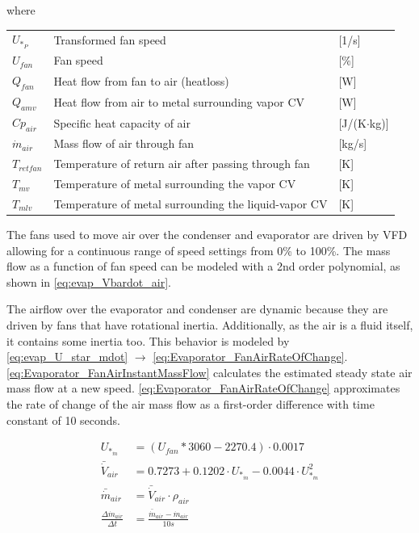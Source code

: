 where

\begin{center}
	\begin{tabular}{l p{10cm} l}
		$U_{*_P}$       & Transformed fan speed                                & [1/\si{s}]                        \\
		$U_{fan}$       & Fan speed                                            & [$\%$]                        \\
		$Q_{fan}$       & Heat flow from fan to air (heatloss)                 & [\si{W}]                          \\
		$Q_{amv}$       & Heat flow from air to metal surrounding vapor CV     & [\si{W}]                          \\
		$Cp_{air}$      & Specific heat capacity of air                        & [\si{J}/(\si{K}$ \cdot $\si{kg})] \\
		$\dot{m}_{air}$ & Mass flow of air through fan                         & [\si{kg}/\si{s}]                  \\
		$T_{retfan}$    & Temperature of return air after passing through fan  & [\si{K}]                          \\
		$T_{mv}$        & Temperature of metal surrounding the vapor CV        & [\si{K}]                          \\
		$T_{mlv}$       & Temperature of metal surrounding the liquid-vapor CV & [\si{K}]
	\end{tabular}
\end{center}

The fans used to move air over the condenser and evaporator are driven by VFD allowing for a continuous range of speed settings from 0\% to 100\%. The mass flow as a function of fan speed can be modeled with a 2nd order polynomial, as shown in \cref{eq:evap_Vbardot_air}.

The airflow over the evaporator and condenser are dynamic because they are driven by fans that have rotational inertia. Additionally, as the air is a fluid itself, it contains some inertia too. This behavior is modeled by \cref{eq:evap_U_star_mdot} $\rightarrow$ \cref{eq:Evaporator_FanAirRateOfChange}. \cref{eq:Evaporator_FanAirInstantMassFlow} calculates the estimated steady state air mass flow at a new speed. \cref{eq:Evaporator_FanAirRateOfChange} approximates the rate of change of the air mass flow as a first-order difference with time constant of 10 seconds.

\begin{align}
	U_{*_{\dot{m}}} & = (U_{fan}*3060 - 2270.4)\cdot 0.0017 \label{eq:evap_U_star_mdot}\\
	\bar{\dot{V}}_{air} & = 0.7273 + 0.1202 \cdot 	U_{*_{\dot{m}}}  -0.0044 \cdot 	U_{*_{\dot{m}}}^2	\label{eq:evap_Vbardot_air} \\
	\bar{\dot{m}}_{air} & = \bar{\dot{V}}_{air} \cdot \rho_{air}	\label{eq:Evaporator_FanAirInstantMassFlow} \\
	\frac{\Delta \dot{m}_{air}}{\Delta t} & = \frac{\bar{\dot{m}}_{air}  - \dot{m}_{air}} {10s}	\label{eq:Evaporator_FanAirRateOfChange}
\end{align}

